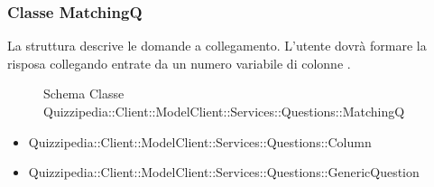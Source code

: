 \subsubsection{Classe MatchingQ}
La struttura descrive le domande a collegamento. L'utente dovrà formare la risposa collegando entrate da un numero variabile di colonne .
\begin{figure}[H]
\centering
\noindent{}
\caption{Schema Classe Quizzipedia::Client::ModelClient::Services::Questions::MatchingQ}
\end{figure}
\begin{itemize}
\item Quizzipedia::Client::ModelClient::Services::Questions::Column
\item Quizzipedia::Client::ModelClient::Services::Questions::GenericQuestion
\end{itemize}
